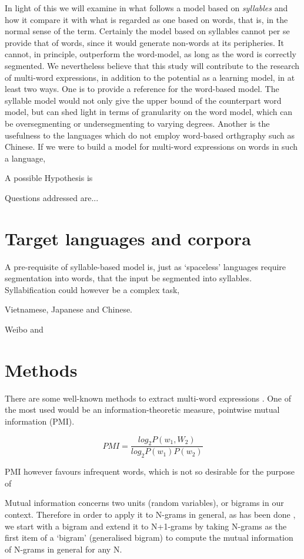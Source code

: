\documentclass{article}
\begin{document}
In light of this we will examine in what follows a model based on \emph{syllables} and how it compare it with what is regarded as one based on words, that is, in the normal sense of the term. Certainly the model based on syllables cannot per se provide that of words, since it would generate non-words at its peripheries. It cannot, in principle, outperform the word-model, as long as the word is correctly segmented. We nevertheless believe that this study will contribute to the research of multi-word expressions, in addition to the potential as a learning model, in at least two ways. One is to provide a reference for the word-based model. The syllable model would not only give the upper bound of the counterpart word model, but can shed light in terms of granularity on the word model, which can be oversegmenting or undersegmenting to varying degrees. Another is the usefulness to the languages which do not employ word-based orthgraphy such as Chinese. If we were to build a model for multi-word expressions on words in such a language, 

A possible Hypothesis is

Questions addressed are...

\section{Target languages and corpora}

A pre-requisite of syllable-based model is, just as `spaceless' languages require segmentation into words, that the input be segmented into syllables. Syllabification could however be a complex task, 

Vietnamese, Japanese and Chinese.

Weibo and 

\section{Methods}

There are some well-known methods to extract multi-word expressions \cite{}. One of the most used would be an information-theoretic measure, pointwise mutual information (PMI). 

$$ PMI=\frac{log_2 P(w_1,W_2)}{log_2 P(w_1)P(w_2)} $$

PMI however favours infrequent words, which is not so desirable for the purpose of 

Mutual information concerns two units (random variables), or bigrams in our context. Therefore in order to apply it to N-grams in general, as has been done  , we start with a bigram and extend it to N+1-grams by taking N-grams as the first item of a `bigram' (generalised bigram) to compute the mutual information of N-grams in general for any N.
\end{document}
